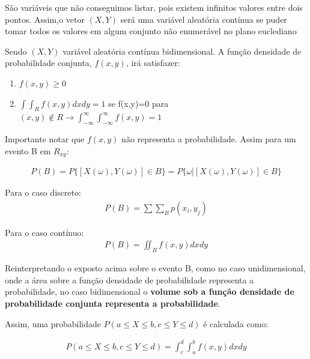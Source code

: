 \documentclass[
  letterpaper,
  DIV=11,
  numbers=noendperiod]{scrartcl}
\begin{document}
São variáveis que não conseguimos listar, pois existem infinitos valores
entre dois pontos. Assim,o vetor \((X,Y)\) será uma variável aleatória
contínua se puder tomar todos os valores em algum conjunto não
enumerável no plano euclediano

\begin{definicao}

Sendo \((X,Y)\) variável aleatória contínua bidimensional. A função
densidade de probabilidade conjunta, \(f(x,y)\), irá satisfazer:

\begin{enumerate}
\def\labelenumi{\roman{enumi})}
\item
  \(f(x,y) \geq 0\)
\item
  \(\int \int_{R} f(x,y)dxdy= 1\) se f(x,y)=0 para
  \((x,y)\notin R \rightarrow \int_{- \infty}^{\infty}\int_{- \infty}^{\infty} f(x,y)=1\)
\end{enumerate}

\end{definicao}

Importante notar que \(f(x,y)\) não representa a probabilidade. Assim
para um evento B em \(R_{xy}\):

\[\begin{array}{ccc}
P(B)=P\{ [X(\omega),Y(\omega)] \in B \}= P\{\omega | [X(\omega),Y(\omega)] \in B \}
\end{array}\]

Para o caso discreto: \[\begin{array}{ccc}
P(B)=\sum \sum_{B} p(x_{i},y_{j})
\end{array}\]

Para o caso contínuo: \[\begin{array}{ccc}
P(B)=\iint_{B} f(x,y)dxdy
\end{array}\]

Reinterpretando o exposto acima sobre o evento B, como no caso
unidimensional, onde a área sobre a função densidade de probabilidade
representa a probabilidade, no caso bidimensional o \textbf{volume sob a
função densidade de probabilidade conjunta representa a probabilidade}.

Assim, uma probabilidade \(P(a \leq X \leq b, c\leq Y \leq d)\) é
calculada como:

\[\begin{array}{ccc}
 P(a \leq X \leq b, c\leq Y \leq d)  = \int_{c}^{d}\int_{a}^{b} f(x,y)dxdy
\end{array}\]
\end{document}
